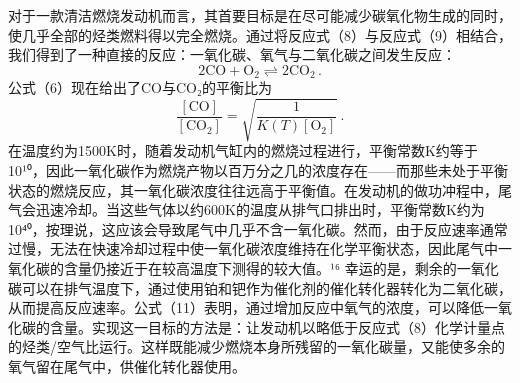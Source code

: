 对于一款清洁燃烧发动机而言，其首要目标是在尽可能减少碳氧化物生成的同时，使几乎全部的烃类燃料得以完全燃烧。通过将反应式（8）与反应式（9）相结合，我们得到了一种直接的反应：一氧化碳、氧气与二氧化碳之间发生反应：
\begin{equation}\tag{6.6.11}\label{eq:6.6.11}
2 \mathrm { C O } + \mathrm { O } _ { 2 } \rightleftharpoons 2 \mathrm { C O } _ { 2 } \, .
\end{equation}
公式（6）现在给出了CO与CO₂的平衡比为
\begin{equation}\tag{6.6.12}\label{eq:6.6.12}
\frac { [ \mathrm { C O } ] } { [ \mathrm { C O } _ { 2 } ] } = \sqrt { \frac { 1 } { K ( T ) [ \mathrm { O } _ { 2 } ] } } \, .
\end{equation}
在温度约为1500K时，随着发动机气缸内的燃烧过程进行，平衡常数K约等于10¹⁰，因此一氧化碳作为燃烧产物以百万分之几的浓度存在——而那些未处于平衡状态的燃烧反应，其一氧化碳浓度往往远高于平衡值。在发动机的做功冲程中，尾气会迅速冷却。当这些气体以约600K的温度从排气口排出时，平衡常数K约为10⁴⁰，按理说，这应该会导致尾气中几乎不含一氧化碳。然而，由于反应速率通常过慢，无法在快速冷却过程中使一氧化碳浓度维持在化学平衡状态，因此尾气中一氧化碳的含量仍接近于在较高温度下测得的较大值。¹⁶ 幸运的是，剩余的一氧化碳可以在排气温度下，通过使用铂和钯作为催化剂的催化转化器转化为二氧化碳，从而提高反应速率。公式（11）表明，通过增加反应中氧气的浓度，可以降低一氧化碳的含量。实现这一目标的方法是：让发动机以略低于反应式（8）化学计量点的烃类/空气比运行。这样既能减少燃烧本身所残留的一氧化碳量，又能使多余的氧气留在尾气中，供催化转化器使用。
